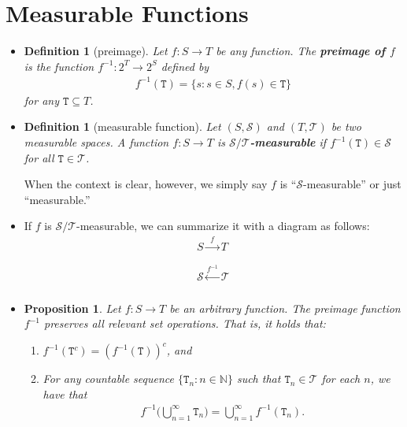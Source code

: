 \documentclass[10pt]{article}
\newtheorem{definition}[lemma]{Definition}
\newtheorem{proposition}[lemma]{Proposition}
\numberwithin{lemma}{section}
\newcommand{\mcal}[1]{\mathcal{#1}}
\newcommand{\Nat}{\mathbb{N}}
\begin{document}
\section{Measurable Functions}

\begin{itemize}
  \item \begin{definition}[preimage]
    Let $f: S \rightarrow T$ be any function. The {\bf preimage of $f$} is the function $f^{-1}: 2^T \rightarrow 2^S$ defined by
    \begin{align*}
      f^{-1}(\mathtt{T}) = \{ s : s \in S, f(s) \in \mathtt{T} \}
    \end{align*}
    for any $\mathtt{T} \subseteq T$.
  \end{definition}

  \item \begin{definition}[measurable function]
    Let $(S, \mcal{S})$ and $(T, \mcal{T})$ be two measurable spaces. A function $f: S \rightarrow T$ is {\bf $\mcal{S}/\mcal{T}$-measurable} if $f^{-1}(\mathtt{T}) \in \mcal{S}$ for all $\mathtt{T} \in \mcal{T}$.
  \end{definition}
  When the context is clear, however, we simply say $f$ is ``$\mcal{S}$-measurable'' or just ``measurable.'' 

  \item If $f$ is $\mcal{S}/\mcal{T}$-measurable, we can summarize it with a diagram as follows:
  \begin{align*}
    S \xrightarrow[\phantom{f^{-1}}]{f} T \\
    \mcal{S} \xleftarrow[]{f^{-1}} \mcal{T}
  \end{align*}

  \item \begin{proposition}
    Let $f: S \rightarrow T$ be an arbitrary function. The preimage function $f^{-1}$ preserves all relevant set operations. That is, it holds that:
    \begin{enumerate}
      \item $f^{-1}(\mathtt{T}^c) = ( f^{-1}(\mathtt{T}) )^c$, and
      \item For any countable sequence $\{ \mathtt{T}_n : n \in \Nat \}$ such that $\mathtt{T}_n \in \mcal{T}$ for each $n$, we have that
      \begin{align*}
        f^{-1}\bigg( \bigcup_{n=1}^\infty \mathtt{T}_n \bigg) = \bigcup_{n=1}^\infty f^{-1}(\mathtt{T}_n).
      \end{align*}
    \end{enumerate}
  \end{proposition}


\end{itemize}
\end{document}
